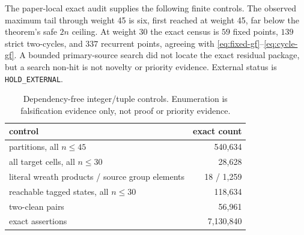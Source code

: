 \documentclass[10pt,a4paper]{amsart}
\theoremstyle{definition}
\theoremstyle{remark}
\begin{document}
The paper-local exact audit supplies the following finite controls.  The
observed maximum tail through weight 45 is six, first reached at weight 45,
far below the theorem's safe $2n$ ceiling.  At weight 30 the exact census is
$59$ fixed points, $139$ strict two-cycles, and $337$ recurrent points,
agreeing with \eqref{eq:fixed-gf}--\eqref{eq:cycle-gf}.  A bounded
primary-source search did not locate the exact residual package, but a search
non-hit is not novelty or priority evidence.  External status is
\texttt{HOLD\_EXTERNAL}.

\begin{table}[!htbp]
\centering
\small
\begin{tabular}{@{}lr@{}}
\toprule
control & exact count \\
\midrule
partitions, all $n\leq45$ & 540,634 \\
all target cells, all $n\leq30$ & 28,628 \\
literal wreath products / source group elements & 18 / 1,259 \\
reachable tagged states, all $n\leq30$ & 118,634 \\
two-clean pairs & 56,961 \\
exact assertions & 7,130,840 \\
\bottomrule
\end{tabular}
\caption{Dependency-free integer/tuple controls.  Enumeration is
falsification evidence only, not proof or priority evidence.}
\label{tab:controls}
\end{table}



\end{document}
